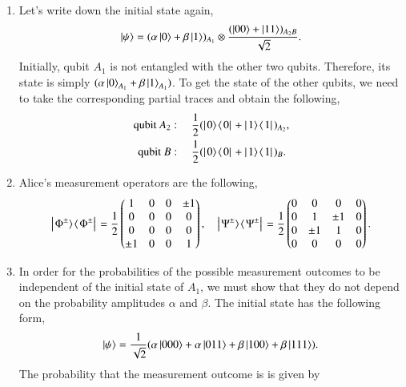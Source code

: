 \begin{solution}
\begin{enumerate}[label=(\alph*)]
    \item Let's write down the initial state again,
    \begin{equation*}
        \left| \psi \right\rangle = (\alpha\left| 0 \right\rangle+\beta\left| 1 \right\rangle)_{A_1} \otimes \frac{(\left| 00 \right\rangle+\left| 11 \right\rangle)_{A_2B}}{\sqrt{2}}.
    \end{equation*}
    Initially, qubit $A_1$ is not entangled with the other two qubits. Therefore, its state is simply $(\alpha\left| 0 \right\rangle_{A_1}+\beta\left| 1 \right\rangle_{A_1})$. To get the state of the other qubits, we need to take the corresponding partial traces and obtain the following,
    \begin{align*}
        \text{qubit }A_2 & : \quad \frac{1}{2} (\outp{0}{0} + \outp{1}{1})_{A_2}, \\
        \text{qubit }B & : \quad \frac{1}{2} (\outp{0}{0} + \outp{1}{1})_{B}.
    \end{align*}
    \item Alice's measurement operators are the following,
    \begin{equation*}
        \outp{\Phi^{\pm}}{\Phi^{\pm}} = \frac{1}{2}\begin{pmatrix}
            1 & 0 & 0 & \pm1 \\
            0 & 0 & 0 & 0 \\
            0 & 0 & 0 & 0 \\
            \pm1 & 0 & 0 & 1
        \end{pmatrix}, \quad \outp{\Psi^{\pm}}{\Psi^{\pm}} = \frac{1}{2}\begin{pmatrix}
            0 & 0 & 0 & 0 \\
            0 & 1 & \pm1 & 0 \\
            0 & \pm1 & 1 & 0 \\
            0 & 0 & 0 & 0
        \end{pmatrix}.
    \end{equation*}
    \item In order for the probabilities of the possible measurement outcomes to be independent of the initial state of $A_1$, we must show that they do not depend on the probability amplitudes $\alpha$ and $\beta$. The initial state has the following form,
    \begin{equation*}
        \left| \psi \right\rangle = \frac{1}{\sqrt{2}}(\alpha\left| 000 \right\rangle + \alpha\left| 011 \right\rangle + \beta\left| 100 \right\rangle + \beta\left| 111 \right\rangle).
    \end{equation*}
    The probability that the measurement outcome is \ket{\Phi^+} is given by

\end{enumerate}
\end{solution}
